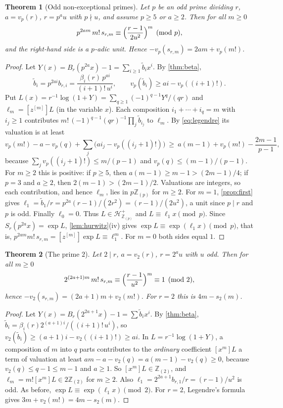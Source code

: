 \documentclass[11pt,reqno]{amsart}
\newtheorem{theorem}{Theorem}[section]
\theoremstyle{definition}
\theoremstyle{remark}
\theoremstyle{plain}
\newcommand{\Z}{\mathbb Z}
\newcommand{\Hur}{\mathcal H}
\newcommand{\hc}[1]{[z^{[#1]}]}
\begin{document}
\begin{theorem}[Odd non-exceptional primes]\label{thm:odd}
Let $p$ be an odd prime dividing $r$, $a=v_p(r)$, $r=p^au$ with $p\nmid u$, and assume $p\ge5$ or $a\ge2$. Then for all $m\ge0$
\[
p^{2am}\,m!\,s_{r,m}\equiv\Bigl(\frac{r-1}{2u^2}\Bigr)^m\pmod p,
\]
and the right-hand side is a $p$-adic unit. Hence $-v_p(s_{r,m})=2am+v_p(m!)$.
\end{theorem}

\begin{proof}
Let $Y(x)=B_r(p^{2a}x)-1=\sum_{i\ge1}\tilde b_ix^i$. By \cref{thm:beta},
\[
\tilde b_i=p^{2ai}b_{r,i}=\frac{\beta_i(r)\,p^{ai}}{(i+1)!\,u^i},\qquad v_p(\tilde b_i)\ge ai-v_p((i+1)!).
\]
Put $L(x)=r^{-1}\log(1+Y)=\sum_{q\ge1}(-1)^{q-1}Y^q/(qr)$ and $\ell_m=\hc mL$ (in the variable $x$). Each composition $i_1+\cdots+i_q=m$ with $i_j\ge1$ contributes $m!\,(-1)^{q-1}(qr)^{-1}\prod_j\tilde b_{i_j}$ to $\ell_m$. By \eqref{eq:legendre} its valuation is at least
\[
v_p(m!)-a-v_p(q)+\sum_j\bigl(ai_j-v_p((i_j+1)!)\bigr)\ \ge\ a(m-1)+v_p(m!)-\frac{2m-1}{p-1},
\]
because $\sum_jv_p((i_j+1)!)\le m/(p-1)$ and $v_p(q)\le(m-1)/(p-1)$. For $m\ge2$ this is positive: if $p\ge5$, then $a(m-1)\ge m-1>(2m-1)/4$; if $p=3$ and $a\ge2$, then $2(m-1)>(2m-1)/2$. Valuations are integers, so each contribution, and hence $\ell_m$, lies in $p\Z_{(p)}$ for $m\ge2$. For $m=1$, \cref{prop:first} gives $\ell_1=\tilde b_1/r=p^{2a}(r-1)/(2r^2)=(r-1)/(2u^2)$, a unit since $p\mid r$ and $p$ is odd. Finally $\ell_0=0$. Thus $L\in\Hur^+_{\Z_{(p)}}$ and $L\equiv\ell_1x\pmod p$. Since $S_r(p^{2a}x)=\exp L$, \cref{lem:hurwitz}(iv) gives $\exp L\equiv\exp(\ell_1x)\pmod p$, that is, $p^{2am}m!\,s_{r,m}=\hc m\exp L\equiv\ell_1^m$. For $m=0$ both sides equal $1$.
\end{proof}

\begin{theorem}[The prime $2$]\label{thm:dyadic}
Let $2\mid r$, $a=v_2(r)$, $r=2^au$ with $u$ odd. Then for all $m\ge0$
\[
2^{(2a+1)m}\,m!\,s_{r,m}\equiv\Bigl(\frac{r-1}{u^2}\Bigr)^m\equiv1\pmod 2,
\]
hence $-v_2(s_{r,m})=(2a+1)m+v_2(m!)$. For $r=2$ this is $4m-s_2(m)$.
\end{theorem}

\begin{proof}
Let $Y(x)=B_r(2^{2a+1}x)-1=\sum\tilde b_ix^i$. By \cref{thm:beta}, $\tilde b_i=\beta_i(r)2^{(a+1)i}/((i+1)!\,u^i)$, so $v_2(\tilde b_i)\ge(a+1)i-v_2((i+1)!)\ge ai$. In $L=r^{-1}\log(1+Y)$, a composition of $m$ into $q$ parts contributes to the \emph{ordinary} coefficient $[x^m]L$ a term of valuation at least $am-a-v_2(q)=a(m-1)-v_2(q)\ge0$, because $v_2(q)\le q-1\le m-1$ and $a\ge1$. So $[x^m]L\in\Z_{(2)}$, and $\ell_m=m![x^m]L\in2\Z_{(2)}$ for $m\ge2$. Also $\ell_1=2^{2a+1}b_{r,1}/r=(r-1)/u^2$ is odd. As before, $\exp L\equiv\exp(\ell_1x)\pmod2$. For $r=2$, Legendre's formula gives $3m+v_2(m!)=4m-s_2(m)$.
\end{proof}
\end{document}
